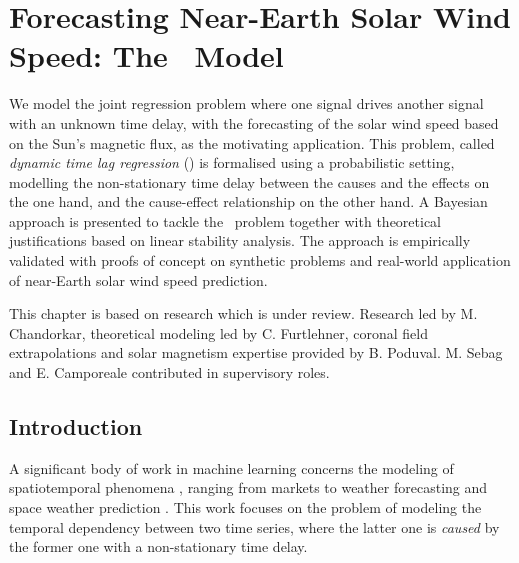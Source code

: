 \chapter{Forecasting Near-Earth Solar Wind Speed: The \XX \ Model}\label{chapter:pdt}

{\small
  We model the joint regression problem where one signal drives another signal with an unknown 
  time delay, with the forecasting of the solar wind speed based on the Sun's magnetic flux, as the 
  motivating application. This problem, called \emph{dynamic time lag regression} (\XX) is 
  formalised using a probabilistic setting, modelling the non-stationary time delay between the 
  causes and the effects on the one hand, and the cause-effect relationship on the other hand. A 
  Bayesian approach is presented to tackle the \XX\ problem together with theoretical 
  justifications based on linear stability analysis. The approach is empirically validated with 
  proofs of concept on synthetic problems and real-world application of near-Earth solar wind speed 
  prediction. 
}


\vfill
{}
\vfill

\noindent
    \parbox{\textwidth}{%
        {\small This chapter is based on research which is under review. 
        Research led by M. Chandorkar, theoretical modeling led by 
        C. Furtlehner, coronal field extrapolations and solar magnetism 
        expertise provided by B. Poduval. M. Sebag and E. Camporeale 
        contributed in supervisory roles.
        }
    }%


\clearpage


\section{Introduction}\label{sec:intro}
A significant body of work in machine learning concerns the modeling of spatiotemporal phenomena 
\citep{SurveyST,NIPSForecasting18}, ranging from markets \citep{Pedreschi} to weather forecasting 
\citep{Horvitz} and space weather prediction \citep{EnricoLorentz,camporeale2018machine,EnricoArxiv}. 
This work focuses on the problem of modeling the temporal dependency between two time series, where 
the latter one is {\em caused} by the former one \citep{Granger} with a non-stationary time delay. 


